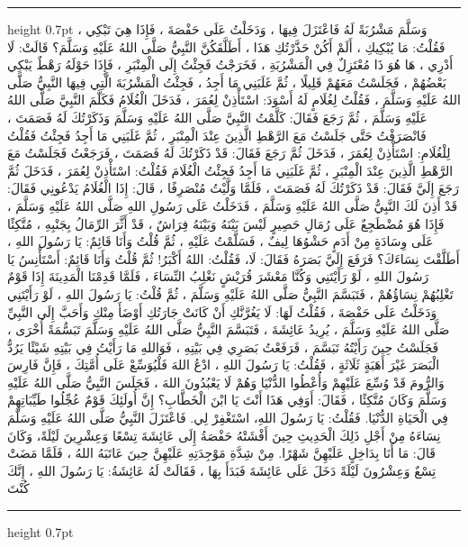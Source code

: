 \documentclass[12pt,openany]{book}
\newenvironment{hadithblock}
  {\par\medskip\noindent\begin{minipage}{\linewidth}\hrule height 0.7pt \vspace{0.6em}\small}
  {\vspace{0.4em}\hrule height 0.7pt\end{minipage}\par\medskip}
\begin{document}
\begin{hadithblock}
وَسَلَّمَ مَشْرُبَةً لَهُ فَاعْتَزَلَ فِيهَا ، وَدَخَلْتُ عَلَى حَفْصَةَ ، فَإِذَا هِيَ تَبْكِي ، فَقُلْتُ: مَا يُبْكِيكِ ، أَلَمْ أَكُنْ حَذَّرْتُكِ هَذَا ، أَطَلَّقَكُنَّ النَّبِيُّ صَلَّى اللهُ عَلَيْهِ وَسَلَّمَ؟ قَالَتْ: لَا أَدْرِي ، هَا هُوَ ذَا مُعْتَزِلٌ فِي الْمَشْرُبَةِ ، فَخَرَجْتُ فَجِئْتُ إِلَى الْمِنْبَرِ ، فَإِذَا حَوْلَهُ رَهْطٌ يَبْكِي بَعْضُهُمْ ، فَجَلَسْتُ مَعَهُمْ قَلِيلًا ، ثُمَّ غَلَبَنِي مَا أَجِدُ ، فَجِئْتُ الْمَشْرُبَةَ الَّتِي فِيهَا النَّبِيُّ صَلَّى اللهُ عَلَيْهِ وَسَلَّمَ ، فَقُلْتُ لِغُلَامٍ لَهُ أَسْوَدَ: اسْتَأْذِنْ لِعُمَرَ ، فَدَخَلَ الْغُلَامُ فَكَلَّمَ النَّبِيَّ صَلَّى اللهُ عَلَيْهِ وَسَلَّمَ ، ثُمَّ رَجَعَ فَقَالَ: كَلَّمْتُ النَّبِيَّ صَلَّى اللهُ عَلَيْهِ وَسَلَّمَ وَذَكَرْتُكَ لَهُ فَصَمَتَ ، فَانْصَرَفْتُ حَتَّى جَلَسْتُ مَعَ الرَّهْطِ الَّذِينَ عِنْدَ الْمِنْبَرِ ، ثُمَّ غَلَبَنِي مَا أَجِدُ فَجِئْتُ فَقُلْتُ لِلْغُلَامِ: اسْتَأْذِنْ لِعُمَرَ ، فَدَخَلَ ثُمَّ رَجَعَ فَقَالَ: قَدْ ذَكَرْتُكَ لَهُ فَصَمَتَ ، فَرَجَعْتُ فَجَلَسْتُ مَعَ الرَّهْطِ الَّذِينَ عِنْدَ الْمِنْبَرِ ، ثُمَّ غَلَبَنِي مَا أَجِدُ فَجِئْتُ الْغُلَامَ فَقُلْتُ: اسْتَأْذِنْ لِعُمَرَ ، فَدَخَلَ ثُمَّ رَجَعَ إِلَيَّ فَقَالَ: قَدْ ذَكَرْتُكَ لَهُ فَصَمَتَ ، فَلَمَّا وَلَّيْتُ مُنْصَرِفًا ، قَالَ: إِذَا الْغُلَامُ يَدْعُونِي فَقَالَ: قَدْ أَذِنَ لَكَ النَّبِيُّ صَلَّى اللهُ عَلَيْهِ وَسَلَّمَ ، فَدَخَلْتُ عَلَى رَسُولِ اللهِ صَلَّى اللهُ عَلَيْهِ وَسَلَّمَ ، فَإِذَا هُوَ مُضْطَجِعٌ عَلَى رُمَالِ حَصِيرٍ لَيْسَ بَيْنَهُ وَبَيْنَهُ فِرَاشٌ ، قَدْ أَثَّرَ الرِّمَالُ بِجَنْبِهِ ، مُتَّكِئًا عَلَى وِسَادَةٍ مِنْ أَدَمٍ حَشْوُهَا لِيفٌ ، فَسَلَّمْتُ عَلَيْهِ ، ثُمَّ قُلْتُ وَأَنَا قَائِمٌ: يَا رَسُولَ اللهِ ، أَطَلَّقْتَ نِسَاءَكَ؟ فَرَفَعَ إِلَيَّ بَصَرَهُ فَقَالَ: لَا، فَقُلْتُ: اللهُ أَكْبَرُ! ثُمَّ قُلْتُ وَأَنَا قَائِمٌ: أَسْتَأْنِسُ يَا رَسُولَ اللهِ ، لَوْ رَأَيْتَنِي وَكُنَّا مَعْشَرَ قُرَيْشٍ نَغْلِبُ النِّسَاءَ ، فَلَمَّا قَدِمْنَا الْمَدِينَةَ إِذَا قَوْمٌ تَغْلِبُهُمْ نِسَاؤُهُمْ ، فَتَبَسَّمَ النَّبِيُّ صَلَّى اللهُ عَلَيْهِ وَسَلَّمَ ، ثُمَّ قُلْتُ: يَا رَسُولَ اللهِ ، لَوْ رَأَيْتَنِي وَدَخَلْتُ عَلَى حَفْصَةَ ، فَقُلْتُ لَهَا: لَا يَغُرَّنَّكِ أَنْ كَانَتْ جَارَتُكِ أَوْضَأَ مِنْكِ وَأَحَبَّ إِلَى النَّبِيِّ صَلَّى اللهُ عَلَيْهِ وَسَلَّمَ ، يُرِيدُ عَائِشَةَ ، فَتَبَسَّمَ النَّبِيُّ صَلَّى اللهُ عَلَيْهِ وَسَلَّمَ تَبَسُّمَةً أُخْرَى ، فَجَلَسْتُ حِينَ رَأَيْتُهُ تَبَسَّمَ ، فَرَفَعْتُ بَصَرِي فِي بَيْتِهِ ، فَوَاللهِ مَا رَأَيْتُ فِي بَيْتِهِ شَيْئًا يَرُدُّ الْبَصَرَ غَيْرَ أَهَبَةٍ ثَلَاثَةٍ ، فَقُلْتُ: يَا رَسُولَ اللهِ ، ادْعُ اللهَ فَلْيُوَسِّعْ عَلَى أُمَّتِكَ ، فَإِنَّ فَارِسَ وَالرُّومَ قَدْ وُسِّعَ عَلَيْهِمْ وَأُعْطُوا الدُّنْيَا وَهُمْ لَا يَعْبُدُونَ اللهَ ، فَجَلَسَ النَّبِيُّ صَلَّى اللهُ عَلَيْهِ وَسَلَّمَ وَكَانَ مُتَّكِئًا ، فَقَالَ: أَوَفِي هَذَا أَنْتَ يَا ابْنَ الْخَطَّابِ؟ إِنَّ أُولَئِكَ قَوْمٌ عُجِّلُوا طَيِّبَاتِهِمْ فِي الْحَيَاةِ الدُّنْيَا. فَقُلْتُ: يَا رَسُولَ اللهِ، اسْتَغْفِرْ لِي. فَاعْتَزَلَ النَّبِيُّ صَلَّى اللهُ عَلَيْهِ وَسَلَّمَ نِسَاءَهُ مِنْ أَجْلِ ذَلِكَ الْحَدِيثِ حِينَ أَفْشَتْهُ حَفْصَةُ إِلَى عَائِشَةَ تِسْعًا وَعِشْرِينَ لَيْلَةً، وَكَانَ قَالَ: مَا أَنَا بِدَاخِلٍ عَلَيْهِنَّ شَهْرًا. مِنْ شِدَّةِ مَوْجِدَتِهِ عَلَيْهِنَّ حِينَ عَاتَبَهُ اللهُ ، فَلَمَّا مَضَتْ تِسْعٌ وَعِشْرُونَ لَيْلَةً دَخَلَ عَلَى عَائِشَةَ فَبَدَأَ بِهَا ، فَقَالَتْ لَهُ عَائِشَةُ: يَا رَسُولَ اللهِ ، إِنَّكَ كُنْتَ 
\end{hadithblock}
\end{document}
